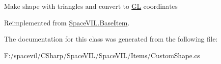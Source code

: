 Make shape with triangles and convert to \mbox{\hyperlink{namespace_g_l}{GL}} coordinates 



Reimplemented from \mbox{\hyperlink{class_space_v_i_l_1_1_base_item_ac111d3d8cef36f406aa11862cefab9e2}{Space\+V\+I\+L.\+Base\+Item}}.



The documentation for this class was generated from the following file\+:\begin{DoxyCompactItemize}
\item 
F\+:/spacevil/\+C\+Sharp/\+Space\+V\+I\+L/\+Space\+V\+I\+L/\+Items/Custom\+Shape.\+cs\end{DoxyCompactItemize}
